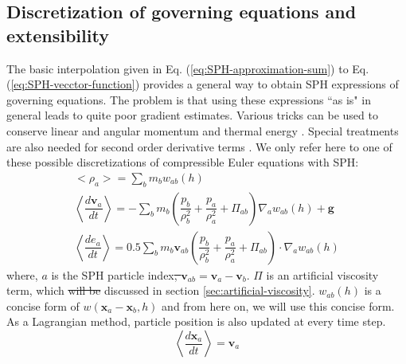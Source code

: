 \documentclass[gmd, manuscript]{copernicus} %
\providecommand{\DIFadd}[1]{{\protect\color{blue}\uwave{#1}}} %
\providecommand{\DIFdel}[1]{{\protect\color{red}\sout{#1}}}                      %
\providecommand{\DIFaddbegin}{} %
\providecommand{\DIFaddend}{} %
\providecommand{\DIFdelbegin}{} %
\providecommand{\DIFdelend}{} %
\begin{document}
\subsection{Discretization of governing equations and extensibility}
The basic interpolation given in Eq. (\ref{eq:SPH-approximation-sum}) to Eq. (\ref{eq:SPH-vecctor-function}) provides a general way to obtain SPH expressions of governing equations. The problem is that using these expressions ``{as is}" in general leads to quite poor gradient estimates. Various tricks can be used to conserve linear and angular momentum and thermal energy \citep{monaghan1992smoothed}. Special treatments are also needed for second order derivative terms \citep{monaghan2005smoothed}. We only refer here to one of these possible discretizations of compressible Euler equations with SPH:
\begin{align}
<\rho_a> = \sum_b m_b w_{ab} \left(h\right) \label{eq:ns-sph-d} \\
\left\langle\dfrac{d \textbf{v}_a}{d t}\right\rangle = -\sum_b m_b \left(\dfrac{p_b}{\rho_b^2} + \dfrac{p_a}{\rho_a^2} + \Pi_{ab}\right) \nabla_a w_{a b}\left(h\right) +\textbf{g} \label{eq:ns-sph-v} \\
\left\langle\dfrac{d e_a}{d t}\right\rangle=
 0.5\sum_b m_b \textbf{v}_{a b}\left(\dfrac{p_b}{\rho_b^2} + \dfrac{p_a}{\rho_a^2} + \Pi_{ab}\right) \cdot \nabla_a w_{a b}\left(h\right) \label{eq:ns-sph-e}
\end{align}
where, $a$ is the SPH particle index\DIFdelbegin \DIFdel{, $\textbf{v}_{a b} = \textbf{v}_a - \textbf{v}_b$}\DIFdelend . $\Pi$ is an artificial viscosity term, which \DIFdelbegin \DIFdel{will be }\DIFdelend \DIFaddbegin \DIFadd{is }\DIFaddend discussed in section \ref{sec:artificial-viscosity}. $w_{a b}\left(h\right)$ is a concise form of $w\left(\textbf{x}_a - \textbf{x}_b, h\right)$ and from here on, we will use this concise form.
As a Lagrangian method, particle position is also updated at every time step.
\begin{equation}
\left\langle\dfrac{d \textbf{x}_a}{dt}\right\rangle = \textbf{v}_a \label{eq:SPH-update-pos}
\end{equation}
\end{document}
